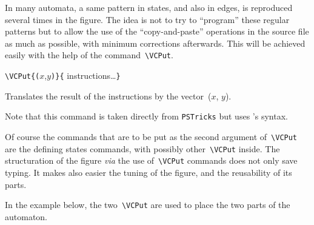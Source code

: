 \documentclass[11pt,twoside]{article}
\newlength{\ColoText}%
\newlength{\ColoFigu}%
\newlength{\parindenttemp} %
\newcommand{\noi}{\noindent}
\newlength{\jsIndent}%
\newcommand{\PSTricks}{\texttt{PSTricks}\xspace}
\begin{document}
In many automata, a same pattern in states, and also in edges, is 
reproduced several times in the figure.
The idea is not to try to ``program'' these regular patterns but to 
allow the use of the ``copy-and-paste'' operations in the source 
file as much as possible, with minimum corrections afterwards.
This will be achieved easily with the help of the  
command~\verb+\VCPut+.


\noi 
\hspace*{-\jsIndent}
\begin{minipage}[t]{\ColoText}
        \par\vspace*{0mm}%
        \footnotesize
\verb+\VCPut{(+$x$,$y$\verb+)}{+ instructions\ldots \verb+}+
\normalsize
\end{minipage}%
\hspace*{1.2em}%
\begin{minipage}[t]{\ColoFigu}%
\par\vspace*{0mm}%
Translates the result of the instructions by the vector~($x$, $y$).
\end{minipage}%

\medskip
\noi
Note that this command is taken directly from \PSTricks but uses \VCSG's syntax.

Of course the commands that are to be put as the second argument 
of~\verb+\VCPut+ are the defining states commands, with possibly  
other~\verb+\VCPut+ inside. 
The structuration of the figure \textit{via} the use of~\verb+\VCPut+
commands does not only save typing.
It makes also easier the tuning of the figure, and the reusability of 
its parts.

In the example below, the two~\verb+\VCPut+ are used to place the 
two parts of the automaton.
\end{document}
